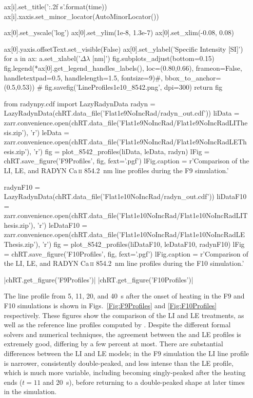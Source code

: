 \begin{pycode}[TimeDepRT]
        ax[i].set_title('{:.2f} s'.format(time))
        ax[i].xaxis.set_minor_locator(AutoMinorLocator())

    ax[0].set_yscale('log')
    ax[0].set_ylim(1e-8, 1.3e-7)
    ax[0].set_xlim(-0.08, 0.08)

    ax[0].yaxis.offsetText.set_visible(False)
    ax[0].set_ylabel('Specific Intensity [SI]')
    for a in ax:
        a.set_xlabel('$\Delta\lambda$ [nm]')
    fig.subplots_adjust(bottom=0.15)
    fig.legend(*ax[0].get_legend_handles_labels(), loc=(0.80,0.66), frameon=False,
               handletextpad=0.5, handlelength=1.5, fontsize=9)#, bbox_to_anchor=(0.5,0.53))
#     fig.savefig('LineProfiles1e10_8542.png', dpi=300)
    return fig

from radynpy.cdf import LazyRadynData
radyn = LazyRadynData(chRT.data_file('Flat1e9NoIncRad/radyn_out.cdf'))
liData = zarr.convenience.open(chRT.data_file('Flat1e9NoIncRad/Flat1e9NoIncRadLIThesis.zip'), 'r')
leData = zarr.convenience.open(chRT.data_file('Flat1e9NoIncRad/Flat1e9NoIncRadLEThesis.zip'), 'r')
fig = plot_8542_profiles(liData, leData, radyn)
lFig = chRT.save_figure('F9Profiles', fig, fext='.pgf')
lFig.caption = r'Comparison of the LI, LE, and RADYN Ca\,\textsc{ii} \SI{854.2}{\nano\metre} line profiles during the F9 simulation.'

radynF10 = LazyRadynData(chRT.data_file('Flat1e10NoIncRad/radyn_out.cdf'))
liDataF10 = zarr.convenience.open(chRT.data_file('Flat1e10NoIncRad/Flat1e10NoIncRadLIThesis.zip'), 'r')
leDataF10 = zarr.convenience.open(chRT.data_file('Flat1e10NoIncRad/Flat1e10NoIncRadLEThesis.zip'), 'r')
fig = plot_8542_profiles(liDataF10, leDataF10, radynF10)
lFig = chRT.save_figure('F10Profiles', fig, fext='.pgf')
lFig.caption = r'Comparison of the LI, LE, and RADYN Ca\,\textsc{ii} \SI{854.2}{\nano\metre} line profiles during the F10 simulation.'
\end{pycode}
\py[TimeDepRT]|chRT.get_figure('F9Profiles')|
\py[TimeDepRT]|chRT.get_figure('F10Profiles')|

The \CaLine{} line profile from 5, 11, 20, and \SI{40}{\second} after the onset of heating in the F9 and F10 simulations is shown in Figs.~\ref{Fig:F9Profiles} and \ref{Fig:F10Profiles} respectively.
These figures show the comparison of the LI and LE treatments, as well as the reference line profiles computed by \Radyn{}.
Despite the different formal solvers and numerical techniques, the agreement between the \Radyn{} and LE profiles is extremely good, differing by a few percent at most.
There are substantial differences between the LI and LE models; in the F9 simulation the LI line profile is narrower, consistently double-peaked, and less intense than the LE profile, which is much more variable, including becoming singly-peaked after the heating ends ($t=11$ and \SI{20}{\second}), before returning to a double-peaked shape at later times in the simulation.

